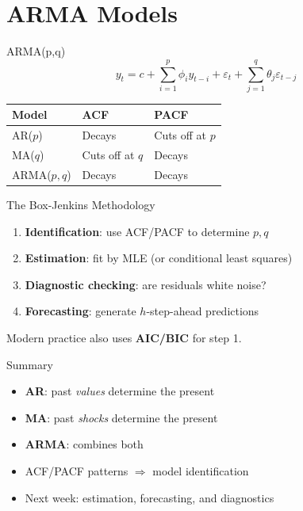 \documentclass[aspectratio=169, 10pt]{beamer}
\begin{document}
\section{ARMA Models}

\begin{frame}{ARMA(p,q)}
\[
y_t = c + \sum_{i=1}^{p}\phi_i y_{t-i} + \varepsilon_t + \sum_{j=1}^{q}\theta_j \varepsilon_{t-j}
\]

\begin{center}
\begin{tabular}{lll}
\toprule
\textbf{Model} & \textbf{ACF} & \textbf{PACF} \\
\midrule
AR($p$) & Decays & Cuts off at $p$ \\
MA($q$) & Cuts off at $q$ & Decays \\
ARMA($p,q$) & Decays & Decays \\
\bottomrule
\end{tabular}
\end{center}
\end{frame}

\begin{frame}{The Box-Jenkins Methodology}
\begin{enumerate}
    \item \textbf{Identification}: use ACF/PACF to determine $p, q$
    \item \textbf{Estimation}: fit by MLE (or conditional least squares)
    \item \textbf{Diagnostic checking}: are residuals white noise?
    \item \textbf{Forecasting}: generate $h$-step-ahead predictions
\end{enumerate}

\vspace{0.5em}
Modern practice also uses \textbf{AIC/BIC} for step 1.
\end{frame}

\begin{frame}{Summary}
\begin{itemize}
    \item \textbf{AR}: past \emph{values} determine the present
    \item \textbf{MA}: past \emph{shocks} determine the present
    \item \textbf{ARMA}: combines both
    \item ACF/PACF patterns $\Rightarrow$ model identification
    \item Next week: \alert{estimation, forecasting, and diagnostics}
\end{itemize}
\end{frame}
\end{document}
